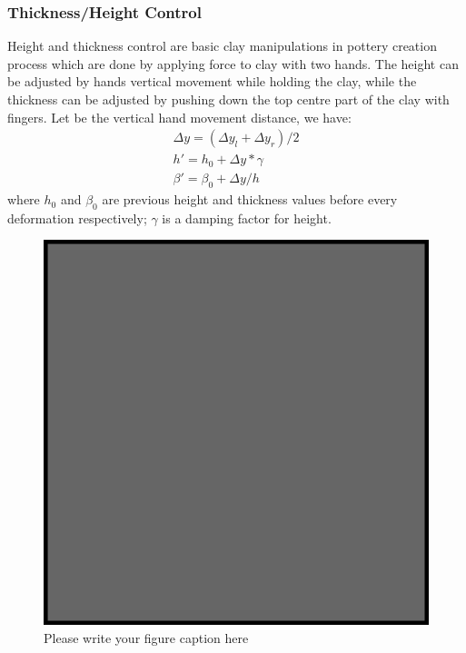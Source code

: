 \subsubsection{Thickness/Height Control}
\label{sec:4.2.2}
Height and thickness control are  basic clay manipulations in pottery creation process which are done by applying force to clay with two hands. The height can be adjusted by hands vertical movement while holding the clay, while the thickness can be adjusted by pushing down the top centre part of the clay with fingers. Let  be the vertical hand movement distance, we have:
\begin{equation}
\begin{split}
\Delta y = (\Delta y_{l} + \Delta y_{r})/2 \\
h' = h_{0} + \Delta y * \gamma \\
\beta' = \beta_{0} + \Delta y/ h
\end{split}
\end{equation}
where $h_{0}$ and $\beta_{0}$ are previous height and thickness values before every deformation respectively; $\gamma$ is a damping factor for height.

\begin{figure}
  \includegraphics{example.eps}
\caption{Please write your figure caption here}
\label{fig:1}       %
\end{figure}

